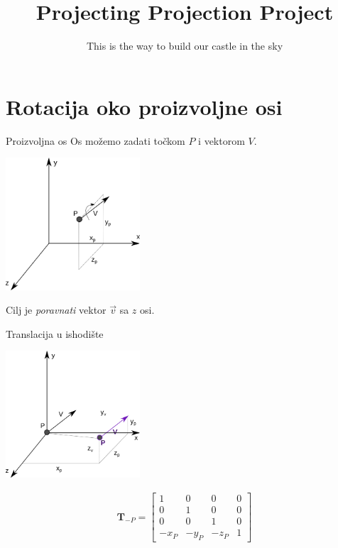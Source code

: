 \documentclass[9pt]{beamer}
\title{Projecting Projection Project}
\subtitle{ This is the way to build our castle in the sky}
\institute{Računalna grafika}
\begin{document}
\begin{frame}
 \titlepage
\end{frame}

\section{Rotacija oko proizvoljne osi}
\begin{frame}{Proizvoljna os}
	Os možemo zadati točkom $P$ i vektorom $V$.
	\begin{center}
		\includegraphics[width=5cm]{./slike/p04_01.png}
	\end{center}
	Cilj je \textit{poravnati} vektor $\vec{v}$ sa $z$ osi.
\end{frame}

\begin{frame}{Translacija u ishodište}
	\begin{center}
		\includegraphics[width=5cm]{./slike/p04_01a.png}
	\end{center}
	\begin{align*}
	\mathbf{T}_{-P} = \left[ \begin{array}{cccc}
	1 & 0 & 0 & 0 \\
	0 & 1 & 0 & 0 \\
	0 & 0 & 1 & 0 \\
	-x_P & -y_P & -z_P & 1 
	\end{array} \right]
	\end{align*}
\end{frame}
\end{document}
